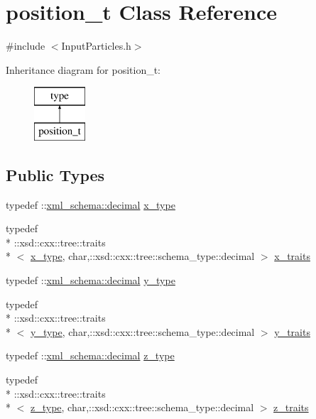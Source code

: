 \hypertarget{classposition__t}{\section{position\-\_\-t Class Reference}
\label{classposition__t}
}


{\ttfamily \#include $<$Input\-Particles.\-h$>$}

Inheritance diagram for position\-\_\-t\-:\begin{figure}[H]
\begin{center}
\leavevmode
\includegraphics[height=2.000000cm]{classposition__t}
\end{center}
\end{figure}
\subsection*{Public Types}
\begin{DoxyCompactItemize}
\item 
typedef \-::\hyperlink{namespacexml__schema_a69bfaf24f63a8c18ebd8e21db6b343df}{xml\-\_\-schema\-::decimal} \hyperlink{classposition__t_a591a4bfd8546a40bc8dfca674cb54719}{x\-\_\-type}
\item 
typedef \\*
\-::xsd\-::cxx\-::tree\-::traits\\*
$<$ \hyperlink{classposition__t_a591a4bfd8546a40bc8dfca674cb54719}{x\-\_\-type}, char,\-::xsd\-::cxx\-::tree\-::schema\-\_\-type\-::decimal $>$ \hyperlink{classposition__t_a93173d63964948fabef843e84ddca444}{x\-\_\-traits}
\item 
typedef \-::\hyperlink{namespacexml__schema_a69bfaf24f63a8c18ebd8e21db6b343df}{xml\-\_\-schema\-::decimal} \hyperlink{classposition__t_afe9eaece61abab81f8ead82576de6175}{y\-\_\-type}
\item 
typedef \\*
\-::xsd\-::cxx\-::tree\-::traits\\*
$<$ \hyperlink{classposition__t_afe9eaece61abab81f8ead82576de6175}{y\-\_\-type}, char,\-::xsd\-::cxx\-::tree\-::schema\-\_\-type\-::decimal $>$ \hyperlink{classposition__t_ae9c33a2fd06ca0d9187e460c61ecb5c0}{y\-\_\-traits}
\item 
typedef \-::\hyperlink{namespacexml__schema_a69bfaf24f63a8c18ebd8e21db6b343df}{xml\-\_\-schema\-::decimal} \hyperlink{classposition__t_ab6171c246c19584481804a5e2da8561f}{z\-\_\-type}
\item 
typedef \\*
\-::xsd\-::cxx\-::tree\-::traits\\*
$<$ \hyperlink{classposition__t_ab6171c246c19584481804a5e2da8561f}{z\-\_\-type}, char,\-::xsd\-::cxx\-::tree\-::schema\-\_\-type\-::decimal $>$ \hyperlink{classposition__t_a96e8127d6eb9e048cb8f26ec77f06cd1}{z\-\_\-traits}
\end{DoxyCompactItemize}
